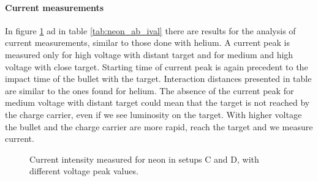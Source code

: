 \paragraph{Current measurements}
In figure \ref{fig:neon_ab_icurr} ad in table \ref{tab:neon_ab_ival} there are results for the analysis of current measurements, similar to those done with helium. A current peak is measured only for high voltage with distant target and for medium and high voltage with close target. Starting time of current peak is again precedent to the impact time of the bullet with the target. Interaction distances presented in table are similar to the ones found for helium.
The absence of the current peak for medium voltage with distant target could mean that the target is not reached by the charge carrier, even if we see luminosity on the target. With higher voltage the bullet and the charge carrier are more rapid, reach the target and we measure current.
\begin{figure}
 \centering
 \hfill
 \caption{Current intensity measured for neon in setups C and D, with different voltage peak values.}
 \label{fig:neon_ab_icurr}
\end{figure}

